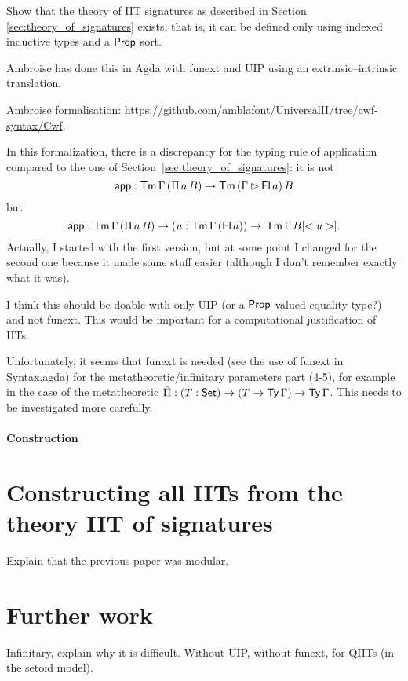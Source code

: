 \documentclass[a4paper,UKenglish,cleveref, autoref]{lipics-v2019}
\begin{document}
Show that the theory of IIT signatures as described in Section
\ref{sec:theory_of_signatures} exists, that is, it can be defined only
using indexed inductive types and a $\mathsf{Prop}$ sort.

Ambroise has done this in Agda with funext and UIP using an
extrinsic--intrinsic translation.

Ambroise formalisation: \url{https://github.com/amblafont/UniversalII/tree/cwf-syntax/Cwf}.

In this formalization, there is a discrepancy for the typing rule of application
compared to the one of Section~\ref{sec:theory_of_signatures}: it is not
\[
   \mathsf{app}  : \mathsf{Tm}\,\Gamma\,(\Pi\,a\,B)\rightarrow\mathsf{Tm}\,(\Gamma\rhd \mathsf{El}\,a)\,B
\]
but
\[
   \mathsf{app}  : \mathsf{Tm}\,\Gamma\,(\Pi\,a\,B)\rightarrow(u : \mathsf{Tm}\,\Gamma\,(\mathsf{El}\,a))\rightarrow\,\mathsf{Tm}\,\Gamma\,B[<u>].
\]
Actually, I started with the first version, but at some point I
changed for the second one because it made some stuff easier (although
I don't remember exactly what it was).

I think this should be doable with only UIP (or a $\mathsf{Prop}$-valued
equality type?) and not funext. This would be important for a
computational justification of IITs.

Unfortunately, it seems that funext is needed (see the use of funext in
Syntax.agda) for the metatheoretic/infinitary
parameters part (4-5), for example in the case of the metatheoretic
$ \hat{\Pi}  : (T:\mathsf{Set})\rightarrow(T\rightarrow\mathsf{Ty}\,\Gamma)\rightarrow\mathsf{Ty}\,\Gamma $. This needs to be
investigated more carefully.

\paragraph*{Construction}


\section{Constructing all IITs from the theory IIT of signatures}
\label{sec:andras}

Explain that the previous paper was modular.

\section{Further work}

Infinitary, explain why it is difficult. Without UIP, without funext,
for QIITs (in the setoid model).

\end{document}
